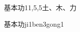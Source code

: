 \begin{entry}{基本功}{11,5,5}{⼟、⽊、⼒}
  \begin{phonetics}{基本功}{ji1ben3gong1}
  \end{phonetics}
\end{entry}
